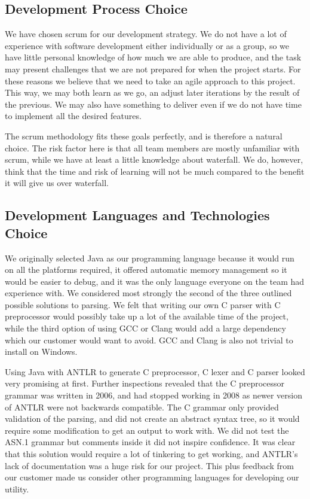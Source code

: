 \subsection{Development Process Choice}
\label{sec:pre:devchoice}
We have chosen scrum for our development strategy. We do not have a lot of
experience with software development either individually or as a group, so we
have little personal knowledge of how much we are able to produce, and the
task may present challenges that we are not prepared for when the project
starts. For these reasons we believe that we need to take an agile approach to
this project. This way, we may both learn as we go, an adjust later iterations
by the result of the previous. We may also have something to deliver even if we
do not have time to implement all the desired features.

The scrum methodology fits these goals perfectly, and is therefore a natural
choice. The risk factor here is that all team members are mostly unfamiliar
with scrum, while we have at least a little knowledge about waterfall. We do,
however, think that the time and risk of learning will not be much compared to
the benefit it will give us over waterfall.

\subsection{Development Languages and Technologies Choice}
\label{sec:pre:langchoice}
We originally selected Java as our programming language because it would run on
all the platforms required, it offered automatic memory management so it would
be easier to debug, and it was the only language everyone on the team had
experience with. We considered most strongly the second of the three outlined
possible solutions to parsing. We felt that writing our own C parser with C
preprocessor would possibly take up a lot of the available time of the project,
while the third option of using GCC or Clang would add a large dependency which
our customer would want to avoid. GCC and Clang is also not trivial to install
on Windows.

Using Java with ANTLR to generate C preprocessor, C lexer and C parser looked
very promising at first. Further inspections revealed that the C preprocessor
grammar was written in 2006, and had stopped working in 2008 as newer version
of ANTLR were not backwards compatible. The C grammar only provided validation
of the parsing, and did not create an abstract syntax tree, so it would require
some modification to get an output to work with. We did not test the ASN.1
grammar but comments inside it did not inspire confidence. It was clear that
this solution would require a lot of tinkering to get working, and ANTLR’s lack
of documentation was a huge risk for our project. This plus feedback from our
customer made us consider other programming languages for developing our
utility.

